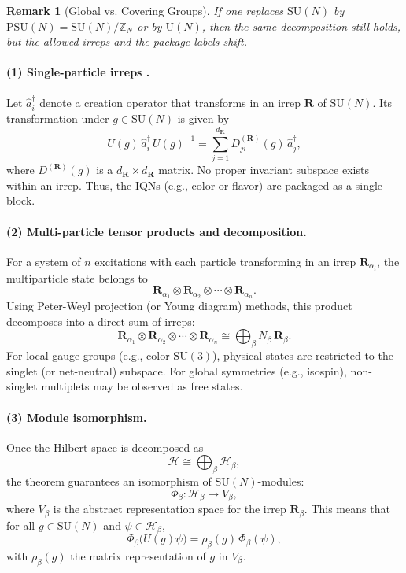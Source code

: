 \documentclass[12pt,a4paper]{article}
\newtheorem{remark}{Remark}
\begin{document}
\begin{remark}[Global vs. Covering Groups]
	If one replaces $\mathrm{SU}(N)$ by $\mathrm{PSU}(N)=\mathrm{SU}(N)/\mathbb Z_N$ or by $\mathrm{U}(N)$, then the same decomposition still holds, but the allowed irreps and the package labels shift.
\end{remark}


\paragraph{(1) Single-particle irreps \cite{PeskinSchroeder,WeinbergBook}.}  
Let $\hat{a}^\dagger_{i}$ denote a creation operator that transforms in an irrep $ \mathbf{R} $ of $\mathrm{SU}(N)$.
Its transformation under $g \in \mathrm{SU}(N)$ is given by
\[
U(g)\,\hat{a}^\dagger_{i}\,U(g)^{-1} = \sum_{j=1}^{d_\mathbf{R}} D^{(\mathbf{R})}_{ji}(g)\,\hat{a}^\dagger_{j},
\]
where $D^{(\mathbf{R})}(g)$ is a $d_\mathbf{R}\times d_\mathbf{R}$ matrix.
No proper invariant subspace exists within an irrep.
Thus, the IQNs (e.g., color or flavor) are packaged as a single block.


\paragraph{(2) Multi-particle tensor products and decomposition.}  
For a system of $n$ excitations with each particle transforming in an irrep $ \mathbf{R}_{\alpha_i} $, the multiparticle state belongs to
\[
\mathbf{R}_{\alpha_1} \otimes \mathbf{R}_{\alpha_2} \otimes \cdots \otimes \mathbf{R}_{\alpha_n}.
\]
Using Peter-Weyl projection (or Young diagram) methods, this product decomposes into a direct sum of irreps:
\[
\mathbf{R}_{\alpha_1} \otimes \mathbf{R}_{\alpha_2} \otimes \cdots \otimes \mathbf{R}_{\alpha_n} \cong \bigoplus_{\beta} N_{\beta}\,\mathbf{R}_{\beta}.
\]
For local gauge groups (e.g., color $\mathrm{SU}(3)$), physical states are restricted to the singlet (or net-neutral) subspace.
For global symmetries (e.g., isospin), non-singlet multiplets may be observed as free states.


\paragraph{(3) Module isomorphism.}  
Once the Hilbert space is decomposed as
\[
\mathcal{H} \cong \bigoplus_{\beta} \mathcal{H}_{\beta},
\]
the theorem guarantees an isomorphism of $\mathrm{SU}(N)$-modules:
\[
\Phi_{\beta}: \mathcal{H}_{\beta} \to V_{\beta},
\]
where $V_{\beta}$ is the abstract representation space for the irrep $\mathbf{R}_\beta$.
This means that for all $g \in \mathrm{SU}(N)$ and $\psi \in \mathcal{H}_{\beta}$,
\[
\Phi_{\beta}\bigl(U(g)\psi\bigr) = \rho_{\beta}(g)\,\Phi_{\beta}(\psi),
\]
with $\rho_{\beta}(g)$ the matrix representation of $g$ in $V_{\beta}$.
\end{document}
